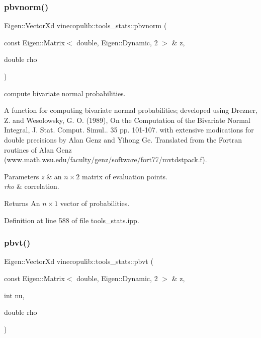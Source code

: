 \subsubsection{\texorpdfstring{pbvnorm()}{pbvnorm()}}
{\footnotesize\ttfamily Eigen\+::\+Vector\+Xd vinecopulib\+::tools\+\_\+stats\+::pbvnorm (\begin{DoxyParamCaption}\item[{const Eigen\+::\+Matrix$<$ double, Eigen\+::\+Dynamic, 2 $>$ \&}]{z,  }\item[{double}]{rho }\end{DoxyParamCaption})\hspace{0.3cm}{\ttfamily [inline]}}



compute bivariate normal probabilities. 

A function for computing bivariate normal probabilities; developed using Drezner, Z. and Wesolowsky, G. O. (1989), On the Computation of the Bivariate Normal Integral, J. Stat. Comput. Simul.. 35 pp. 101-\/107. with extensive modications for double precisions by Alan Genz and Yihong Ge. Translated from the Fortran routines of Alan Genz (www.\+math.\+wsu.\+edu/faculty/genz/software/fort77/mvtdstpack.f).


\begin{DoxyParams}{Parameters}
{\em z} & an $ n \times 2 $ matrix of evaluation points. \\
\hline
{\em rho} & correlation.\\
\hline
\end{DoxyParams}
\begin{DoxyReturn}{Returns}
An $ n \times 1 $ vector of probabilities. 
\end{DoxyReturn}


Definition at line 588 of file tools\+\_\+stats.\+ipp.

\mbox{\label{namespacevinecopulib_1_1tools__stats_a1e81bac0b4e1e9e0158b800a7db0d1af}} 
\subsubsection{\texorpdfstring{pbvt()}{pbvt()}}
{\footnotesize\ttfamily Eigen\+::\+Vector\+Xd vinecopulib\+::tools\+\_\+stats\+::pbvt (\begin{DoxyParamCaption}\item[{const Eigen\+::\+Matrix$<$ double, Eigen\+::\+Dynamic, 2 $>$ \&}]{z,  }\item[{int}]{nu,  }\item[{double}]{rho }\end{DoxyParamCaption})\hspace{0.3cm}{\ttfamily [inline]}}



